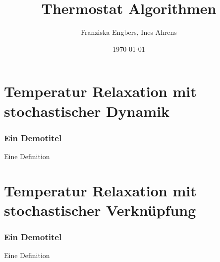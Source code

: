 \documentclass{beamer}
\title{Thermostat Algorithmen}
\author{Franziska Engbers, Ines Ahrens}
\date{\today}
\begin{document}
\maketitle
\frame{\tableofcontents[currentsection]}

\section{Temperatur Relaxation mit stochastischer Dynamik}
\begin{frame} %
  \frametitle{Ein Demotitel} %
  \begin{Definition} %
    Eine Definition
  \end{Definition}
\end{frame}


\section{Temperatur Relaxation mit stochastischer Verknüpfung}
\begin{frame} %
	\frametitle{Ein Demotitel} %
	\begin{Definition} %
		Eine Definition
	\end{Definition}
\end{frame}
\end{document}
